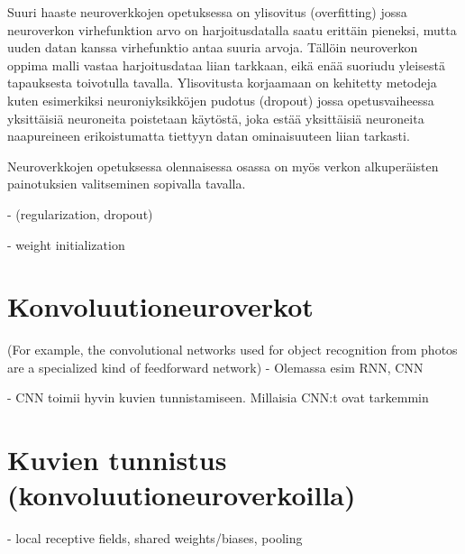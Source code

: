 \documentclass[11pt]{article}
\theoremstyle{plain}
\theoremstyle{definition}
\begin{document}
  Suuri haaste neuroverkkojen opetuksessa on ylisovitus (overfitting) jossa neuroverkon virhefunktion arvo on harjoitusdatalla saatu erittäin pieneksi, mutta uuden datan kanssa virhefunktio antaa suuria arvoja. Tällöin neuroverkon oppima malli vastaa harjoitusdataa liian tarkkaan, eikä enää suoriudu yleisestä tapauksesta toivotulla tavalla. Ylisovitusta korjaamaan on kehitetty metodeja kuten esimerkiksi neuroniyksikköjen pudotus (dropout) jossa opetusvaiheessa yksittäisiä neuroneita poistetaan käytöstä, joka estää yksittäisiä neuroneita naapureineen erikoistumatta tiettyyn datan ominaisuuteen liian tarkasti.

  Neuroverkkojen opetuksessa olennaisessa osassa on myös verkon alkuperäisten painotuksien valitseminen sopivalla tavalla.

  - (regularization, dropout)

  - weight initialization

  \section{Konvoluutioneuroverkot}
   (For example, the convolutional networks used for object recognition from photos are a specialized kind of feedforward network)
  - Olemassa esim RNN, CNN

  - CNN toimii hyvin kuvien tunnistamiseen. Millaisia CNN:t ovat tarkemmin
  \section{Kuvien tunnistus (konvoluutioneuroverkoilla)}
  - local receptive fields, shared weights/biases, pooling

  \renewcommand{\refname}{Lähteet}
  
  

  
\end{document}
